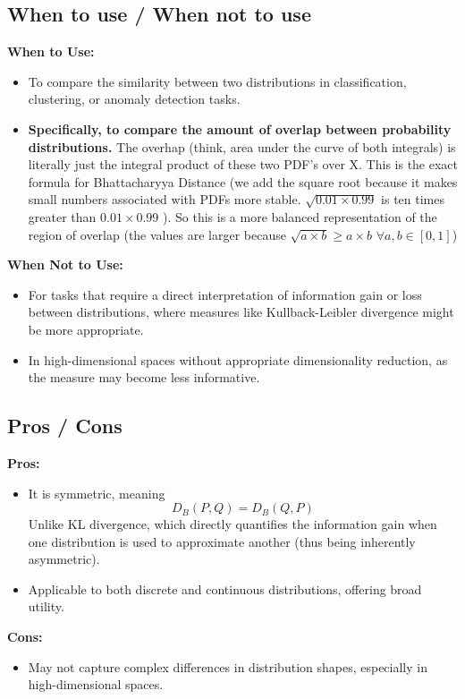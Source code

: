 \documentclass[12pt]{article}
\begin{document}
\subsection{When to use / When not to use}
\textbf{When to Use:}
\begin{itemize}
    \item To compare the similarity between two distributions in classification, clustering, or anomaly detection tasks.
	\item \textbf{Specifically, to compare the amount of overlap between probability distributions.} The overhap (think, area under the curve of both integrals) is literally just the integral product of these two PDF's over X. This is the exact formula for Bhattacharyya Distance (we add the square root because it makes small numbers associated with PDFs more stable. \(\sqrt{0.01 \times 0.99}\) is ten times greater than \(0.01 \times 0.99\) ). So this is a more balanced representation of the region of overlap (the values are larger because \(\sqrt{a \times b} \geq a \times b\) \( \forall a,b \in [0,1]\))
\end{itemize}
\textbf{When Not to Use:}
\begin{itemize}
    \item For tasks that require a direct interpretation of information gain or loss between distributions, where measures like Kullback-Leibler divergence might be more appropriate.
    \item In high-dimensional spaces without appropriate dimensionality reduction, as the measure may become less informative.
\end{itemize}

\subsection{Pros / Cons}
\textbf{Pros:}
\begin{itemize}
    \item It is symmetric, meaning 
\[ D_B(P, Q) = D_B(Q, P) \]
Unlike KL divergence, which directly quantifies the information gain when one distribution is used to approximate another (thus being inherently asymmetric).

    \item Applicable to both discrete and continuous distributions, offering broad utility.
\end{itemize}
\textbf{Cons:}
\begin{itemize}
    \item May not capture complex differences in distribution shapes, especially in high-dimensional spaces.
\end{itemize}
\end{document}
